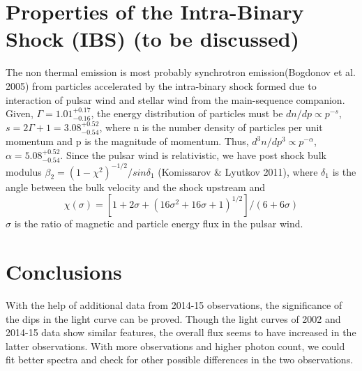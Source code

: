 \documentclass[a4paper,fleqn,usenatbib]{mnras}
\begin{document}
\section{Properties of the Intra-Binary Shock (IBS) (to be discussed)}
The non thermal emission is most probably synchrotron emission(Bogdonov et al. 2005) from particles accelerated by the intra-binary shock formed due to interaction of pulsar wind and stellar wind from the main-sequence companion. Given, $\Gamma = 1.01_{-0.16}^{+0.17}$, the energy distribution of particles must be $dn/dp \propto p^{-s}$, $s = 2\Gamma + 1 = 3.08_{-0.54}^{+0.52}$, where n is the number density of particles per unit momentum and p is the magnitude of momentum. Thus, $d^3 n/dp^3 \propto p^{-\alpha}$, $\alpha = 5.08_{-0.54}^{+0.52}$. Since the pulsar wind is relativistic, we have post shock bulk modulus
$\beta_2 = (1 - \chi^2)^{-1/2}/sin\delta_1$ (Komissarov \& Lyutkov 2011), where $\delta_1$ is the angle between the bulk velocity and the shock upstream and
\begin{equation}
\chi(\sigma) = [1 + 2\sigma + (16\sigma^2 + 16\sigma + 1)^{1/2}]/(6 + 6\sigma)
\end{equation}
$\sigma$ is the ratio of magnetic and particle energy flux in the pulsar wind. 

\section{Conclusions}

With the help of additional data from 2014-15 observations, the significance of the dips in the light curve can be proved. Though the light curves of 2002 and 2014-15 data show similar features, the overall flux seems to have increased in the latter observations. With more observations and higher photon count, we could fit better spectra and check for other possible differences in the two observations.






%










\bsp	%
\label{lastpage}
\end{document}
